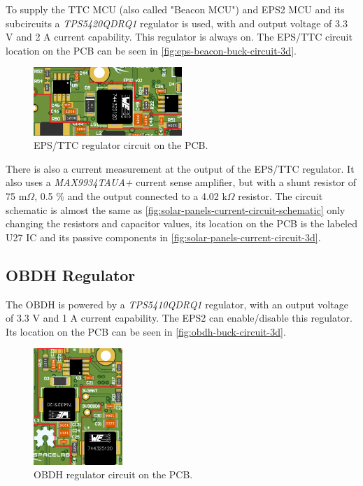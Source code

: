 To supply the TTC MCU (also called "Beacon MCU") and EPS2 MCU and its subcircuits a \textit{TPS5420QDRQ1} regulator is used, with and output voltage of 3.3 V and 2 A current capability. This regulator is always on.
The EPS/TTC circuit location on the PCB can be seen in \autoref{fig:eps-beacon-buck-circuit-3d}.

\begin{figure}[!ht]
    \begin{center}
        \includegraphics[width=0.5\textwidth]{figures/eps-beacon-buck-circuit-3d.png}
        \caption{EPS/TTC regulator circuit on the PCB.}
        \label{fig:eps-beacon-buck-circuit-3d}
    \end{center}
\end{figure}

There is also a current measurement at the output of the EPS/TTC regulator. It also uses a \textit{MAX9934TAUA+} current sense amplifier, but with a shunt resistor of 75 m$\Omega$, 0.5 \% and the output connected to a 4.02 k$\Omega$ resistor.
The circuit schematic is almost the same as \autoref{fig:solar-panels-current-circuit-schematic} only changing the resistors and capacitor values, its location on the PCB is the labeled U27 IC and its passive components in \autoref{fig:solar-panels-current-circuit-3d}.

\subsection{OBDH Regulator}

The OBDH is powered by a \textit{TPS5410QDRQ1} regulator, with an output voltage of 3.3 V and 1 A current capability. The EPS2 can enable/disable this regulator.
Its location on the PCB can be seen in \autoref{fig:obdh-buck-circuit-3d}.

\begin{figure}[!ht]
    \begin{center}
        \includegraphics[width=0.3\textwidth]{figures/obdh-buck-circuit-3d.png}
        \caption{OBDH regulator circuit on the PCB.}
        \label{fig:obdh-buck-circuit-3d}
    \end{center}
\end{figure}

